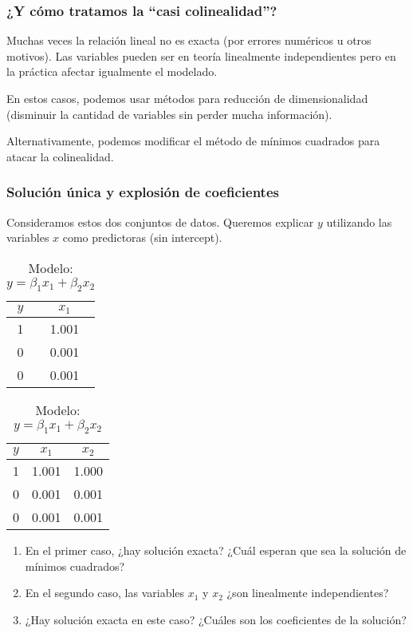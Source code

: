 \documentclass[aspectratio=169,12pt]{beamer}
\begin{document}
\begin{frame}
\frametitle{¿Y cómo tratamos la ``casi colinealidad''?}

Muchas veces la relación lineal no es exacta (por errores numéricos u otros motivos).
Las variables pueden ser en teoría linealmente independientes pero en la práctica afectar igualmente el modelado.

En estos casos, podemos usar métodos para reducción de dimensionalidad (disminuir la cantidad de variables sin perder mucha información).

Alternativamente, podemos modificar el método de mínimos cuadrados para atacar la colinealidad.

\end{frame}

\begin{frame}
\frametitle{Solución única y explosión de coeficientes}

Consideramos estos dos conjuntos de datos. Queremos explicar $y$ utilizando las variables $x$ como predictoras (sin intercept).

\vspace{-0.3cm}

\begin{table}[htbp]
\centering
\begin{minipage}{.5\textwidth}
  \centering
  \caption*{Modelo: $y = \beta_1 x_1$}
  \begin{tabular}{cc}
    \hline
    \( y \) & \( x_1 \) \\
    \hline
    1 & 1.001 \\
    0 & 0.001 \\
    0 & 0.001 \\
    \hline
  \end{tabular}
\end{minipage}%
\begin{minipage}{.5\textwidth}
  \centering
  \caption*{Modelo: $y = \beta_1 x_1 + \beta_2 x_2$}
  \begin{tabular}{ccc}
    \hline
    \( y \) & \( x_1 \) & \( x_2 \) \\
    \hline
    1 & 1.001 & 1.000 \\
    0 & 0.001 & 0.001 \\
    0 & 0.001 & 0.001 \\
    \hline
  \end{tabular}
\end{minipage}
\end{table}

\begin{enumerate}
\item En el primer caso, ¿hay solución exacta? ¿Cuál esperan que sea la solución de mínimos cuadrados?
\item En el segundo caso, las variables $x_1$ y $x_2$ ¿son linealmente independientes?
\item ¿Hay solución exacta en este caso? ¿Cuáles son los coeficientes de la solución?
\end{enumerate}

\end{frame}
\end{document}
